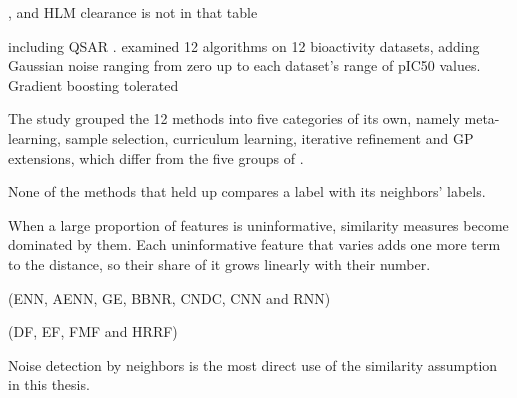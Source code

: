 , and HLM clearance is not in that table

including QSAR \citep{Cortes2015}. \citet{Cortes2015} examined 12 algorithms on 12 bioactivity datasets, adding Gaussian noise ranging from zero up to each dataset's range of pIC50 values. Gradient boosting tolerated

The study grouped the 12 methods into five categories of its own, namely meta-learning, sample selection, curriculum learning, iterative refinement and GP extensions, which differ from the five groups of \citet{Song2022}.

None of the methods that held up compares a label with its neighbors' labels.

When a large proportion of features is uninformative, similarity measures become dominated by them. Each uninformative feature that varies adds one more term to the distance, so their share of it grows linearly with their number.

(ENN, AENN, GE, BBNR, CNDC, CNN and RNN)

(DF, EF, FMF and HRRF)

Noise detection by neighbors is the most direct use of the similarity assumption in this thesis.

